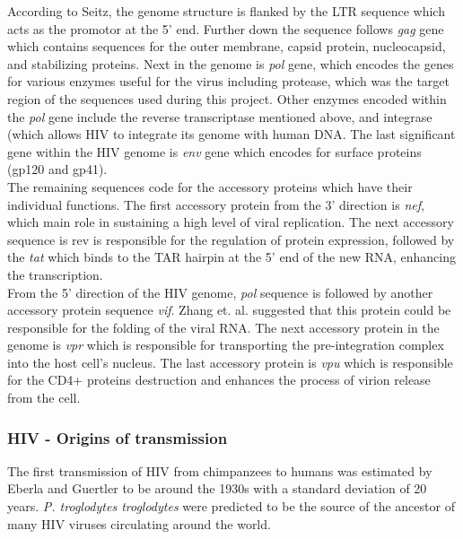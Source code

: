 According to Seitz, the genome structure is flanked by the LTR sequence which acts as the promotor at the 5' end. 
Further down the sequence follows \textit{gag} gene which contains sequences for the outer membrane, capsid protein, nucleocapsid, and stabilizing proteins. 
Next in the genome is \textit{pol} gene, which encodes the genes for various enzymes useful for the virus including protease, which was the target region of the sequences used during this project. 
Other enzymes encoded within the \textit{pol} gene include the reverse transcriptase mentioned above, and integrase (which allows HIV to integrate its genome with human DNA. 
The last significant gene within the HIV genome is \textit{env} gene which encodes for surface proteins (gp120 and gp41).\cite{seitz_2016_human}\\
The remaining sequences code for the accessory proteins which have their individual functions. 
The first accessory protein from the 3’ direction is \textit{nef}, which main role in sustaining a high level of viral replication. 
The next accessory sequence is \textit{}{rev} is responsible for the regulation of protein expression, followed by the \textit{tat} which binds to the TAR hairpin at the 5’ end of the new RNA, enhancing the transcription.\cite{turner_1999_structural}\\
From the 5’ direction of the HIV genome, \textit{pol} sequence is followed by another accessory protein sequence \textit{vif}.
Zhang et. al. suggested that this protein could be responsible for the folding of the viral RNA.\cite{zhang_2000_human}
The next accessory protein in the genome is \textit{vpr} which is responsible for transporting the pre-integration complex into the host cell’s nucleus. \cite{kogan_2011_hiv1} 
The last accessory protein is \textit{vpu} which is responsible for the CD4+ proteins destruction and enhances the process of virion release from the cell. \cite{khan_2021_role}

        \subsubsection{HIV - Origins of transmission}

The first transmission of HIV from chimpanzees to humans was estimated by Eberla and Guertler to be around the 1930s with a standard 
deviation of 20 years.\cite{eberle_2012_hiv}
\textit{P. troglodytes troglodytes} were predicted to be the source of the ancestor of many HIV viruses circulating around the world.


